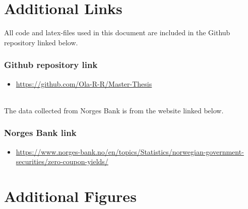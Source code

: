 
\chapter{Additional Links}\label{ch:links}

\noindent All code and latex-files used in this document are included in the Github repository linked below.

\subsection*{Github repository link}

\begin{itemize}
    \item \url{https://github.com/Ola-R-R/Master-Thesis}
\end{itemize} 

\ \\

\noindent The data collected from Norges Bank is from the website linked below.

\subsection*{Norges Bank link}

\begin{itemize}
    \item \url{https://www.norges-bank.no/en/topics/Statistics/norwegian-government-securities/zero-coupon-yields/}
\end{itemize}

\chapter{Additional Figures}


